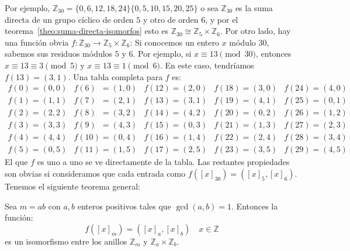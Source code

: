   Por ejemplo,
  \(\mathbb{Z}_{30}
      = \{0, 6, 12, 18, 24\} \{0, 5, 10, 15, 20, 25\}\)
  o sea \(\mathbb{Z}_{30}\)
  es la suma directa de un grupo cíclico de orden \(5\)
  y otro de orden \(6\),
  y por el teorema~\ref{theo:suma-directa-isomorfos}
  esto es
    \(\mathbb{Z}_{30} \cong \mathbb{Z}_5 \times \mathbb{Z}_6\).
  Por otro lado,
  hay una función obvia
  \(f \colon \mathbb{Z}_{30}
     \rightarrow \mathbb{Z}_5 \times \mathbb{Z}_6\):
  Si conocemos un entero \(x\) módulo \(30\),
  sabemos sus residuos módulos \(5\) y \(6\).%
  Por ejemplo,
  si \(x \equiv 13 \pmod{30}\),
  entonces \(x \equiv 13 \equiv 3 \pmod{5}\)
  y \(x \equiv 13 \equiv 1 \pmod{6}\).
  En este caso,
  tendríamos \(f(13) = (3, 1)\).
  Una tabla completa para \(f\) es:
  \begin{equation*}
    \begin{array}{*{5}{l}}
      f(0) = (0, 0) &  f(6) \phantom{0}= (1, 0)
		    & f(12) = (2, 0) & f(18) = (3, 0) &
		      f(24) = (4, 0) \\
      f(1) = (1, 1) &  f(7) \phantom{0}= (2, 1)
		    & f(13) = (3, 1) & f(19) = (4, 1) &
		      f(25) = (0, 1) \\
      f(2) = (2, 2) &  f(8) \phantom{0}= (3, 2)
		    & f(14) = (4, 2) & f(20) = (0, 2) &
		      f(26) = (1, 2) \\
      f(3) = (3, 3) &  f(9) \phantom{0}= (4, 3)
		    & f(15) = (0, 3) & f(21) = (1, 3) &
		      f(27) = (2, 3) \\
      f(4) = (4, 4) & f(10) = (0, 4) & f(16) = (1, 4) &
		      f(22) = (2, 4) &
		      f(28) = (3, 4) \\
      f(5) = (0, 5) & f(11) = (1, 5) & f(17) = (2, 5) &
		      f(23) = (3, 5) &
		      f(29) = (4, 5)
    \end{array}
  \end{equation*}
  El que \(f\) es uno a uno se ve directamente de la tabla.
  Las restantes propiedades son obvias si consideramos
  que cada entrada como
  \(f([x]_{30}) = ([x]_5, [x]_6)\).
  Tenemos el siguiente teorema general:
  \begin{theorem}
    \label{theo:isomorfismo-anillo-Zm}
    Sea \(m = a b\) con \(a, b\) enteros positivos
    tales que \(\gcd(a, b) = 1\).
    Entonces la función:
    \begin{equation*}
      f([x]_m) = ([x]_a, [x]_b) \quad x \in \mathbb{Z}
    \end{equation*}
    es un isomorfismo%
    entre los anillos \(\mathbb{Z}_m\)
    y \(\mathbb{Z}_a \times \mathbb{Z}_b\).
  \end{theorem}
